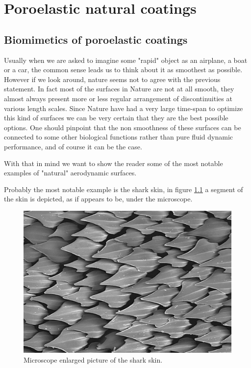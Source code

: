 \chapter{Poroelastic natural coatings}


\section{Biomimetics of poroelastic coatings}

Usually when we are asked to imagine some "rapid" object as an airplane, a boat or a car, the common sense leads us to think about it as smoothest as possible.
However if we look around, nature seems not to agree with the previous statement.
In fact most of the surfaces in Nature are not at all smooth, they almost always present more or less regular arrangement of discontinuities at various length scales.
Since Nature have had a very large time-span to optimize this kind of surfaces we can be very certain that they are the best possible options.
One should pinpoint that the non smoothness of these surfaces can be connected to some other biological functions rather than pure fluid dynamic performance, and of course it can be the case.

With that in mind we want to show the reader some of the most notable examples of "natural" aerodynamic surfaces.

Probably the most notable example is the shark skin, in figure \ref{fig:shark} a segment of the skin is depicted, as if appears to be, under the microscope.

\begin{figure}[h]
	\centering
	\includegraphics[width=0.6\linewidth]{chapter_1/shark}
	\caption{Microscope enlarged picture of the shark skin.}
	\label{fig:shark}
\end{figure}

